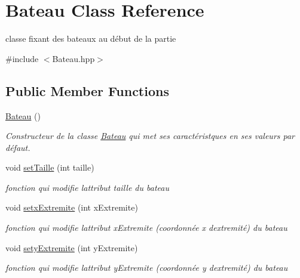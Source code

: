 \hypertarget{class_bateau}{}\section{Bateau Class Reference}
\label{class_bateau}


classe fixant des bateaux au début de la partie  




{\ttfamily \#include $<$Bateau.\+hpp$>$}

\subsection*{Public Member Functions}
\begin{DoxyCompactItemize}
\item 
\mbox{\label{class_bateau_af46de2e08abe6b61e218b6cbdc595bfb}} 
\mbox{\hyperlink{class_bateau_af46de2e08abe6b61e218b6cbdc595bfb}{Bateau}} ()
\begin{DoxyCompactList}\small\item\em Constructeur de la classe \mbox{\hyperlink{class_bateau}{Bateau}} qui met ses caractéristques en ses valeurs par défaut. \end{DoxyCompactList}\item 
void \mbox{\hyperlink{class_bateau_ac06303b2d1c9b2c9d6b29e6f65eaff26}{set\+Taille}} (int taille)
\begin{DoxyCompactList}\small\item\em fonction qui modifie l\textquotesingle{}attribut taille du bateau \end{DoxyCompactList}\item 
void \mbox{\hyperlink{class_bateau_aecf45729913eb0c51a82475b996273ce}{setx\+Extremite}} (int x\+Extremite)
\begin{DoxyCompactList}\small\item\em fonction qui modifie l\textquotesingle{}attribut x\+Extremite (coordonnée x d\textquotesingle{}extremité) du bateau \end{DoxyCompactList}\item 
void \mbox{\hyperlink{class_bateau_a7fa9258d53309fcf41de04199d702fe7}{sety\+Extremite}} (int y\+Extremite)
\begin{DoxyCompactList}\small\item\em fonction qui modifie l\textquotesingle{}attribut y\+Extremite (coordonnée y d\textquotesingle{}extremité) du bateau \end{DoxyCompactList}\item 

\end{DoxyCompactItemize}
